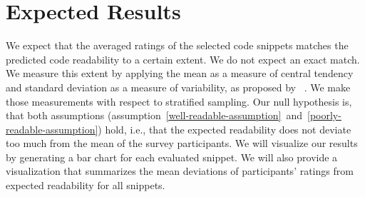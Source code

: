\documentclass[%
class=scrreprt,
chapterprefix=false,%
open=right,%
twoside=false,%
paper=a4,%
logofile={Logo\_zentral\_farbig\_EN.png},%
thesistype=masterproposal,%
UKenglish,%
]{se2thesis}
\begin{document}
\section{Expected Results}
We expect that the averaged ratings of the selected code snippets matches the predicted code readability to a certain extent. We do not expect an exact match.
We measure this extent by applying the mean as a measure of central tendency and standard deviation as a measure of variability, as proposed by \citeauthor{linaker2015guidelines}~\cite{linaker2015guidelines}. We make those measurements with respect to stratified sampling.
Our null hypothesis is, that both assumptions (assumption~\ref{well-readable-assumption}~and~\ref{poorly-readable-assumption}) hold, i.e., that the expected readability does not deviate too much from the mean of the survey participants.
We will visualize our results by generating a bar chart for each evaluated snippet. We will also provide a visualization that summarizes the mean deviations of participants' ratings from expected readability for all snippets.
	
	\backmatter
	
	\printbibliography
	
\end{document}

